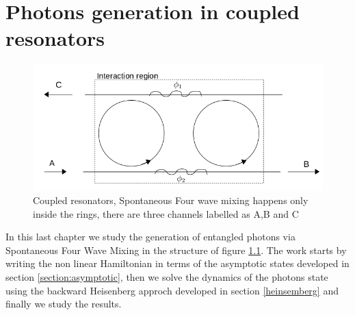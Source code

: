 \chapter{Photons generation in coupled resonators}
\begin{figure}
\centering
\includegraphics[width = \textwidth]{img/system}
\caption{Coupled resonators, Spontaneous Four wave mixing happens only inside the rings, there are three channels labelled as A,B and C}
\label{couplesstructure}
\end{figure}

In this last chapter we study the generation of entangled photons via Spontaneous Four Wave Mixing in the structure of figure \ref{couplesstructure}. The work starts by writing the non linear Hamiltonian in terms of the asymptotic states developed in section \ref{section:asymptotic}, then we solve the dynamics of the photons state using the backward Heisenberg approch developed in section \ref{heinsemberg} and finally we study the results.\\
